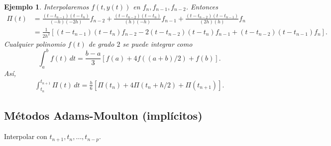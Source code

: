 \documentclass[11pt,letterpaper]{article}
\newtheorem{example}{Ejemplo}
\begin{document}
\begin{example}
  Interpolaremos $f(t,y(t))$ en $f_n,f_{n-1},f_{n-2}$. Entonces
  \begin{align}
    \Pi(t)
    &= \frac{(t-t_{n-1})(t-t_n)}{(-h)(-2h)}f_{n-2}
    +  \frac{(t-t_{n-2})(t-t_n)}{(h)(-h)}f_{n-1}
    +  \frac{(t-t_{n-2})(t-t_{n-1})}{(2h)(h)}f_{n}
    \\
    &=
    \frac{1}{2h^{2}}
    \left[
      (t-t_{n-1})(t-t_n)f_{n-2}
    - 2(t-t_{n-2})(t-t_n)f_{n-1}
    + (t-t_{n-2})(t-t_{n-1})f_{n}
    \right]
  .\end{align}
  Cualquier polinomio $f(t)$ de grado $2$ se puede integrar como
  \begin{equation}
    \int_{a}^{b}f(t)\,dt = \frac{b-a}{3}[f(a)+4f((a+b)/2)+f(b)]
  .\end{equation}
  Así,
  \begin{align}
     \int_{t_n}^{t_{n+1}}\Pi(t)\,dt
     =
     \frac{h}{6}[\Pi(t_{n})+4\Pi(t_{n}+h / 2)+\Pi(t_{n+1})]
  .\end{align}
\end{example}

\subsection{Métodos Adams-Moulton (implícitos)}
Interpolar con $t_{n+1},t_n,\dots,t_{n-p}$.
\end{document}
